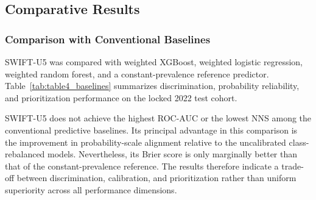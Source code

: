 \documentclass[a4paper,fleqn]{cas-sc}
\begin{document}
\subsection{Comparative Results}
\label{sec:res_comparative}

\subsubsection{Comparison with Conventional Baselines}

SWIFT-U5 was compared with weighted XGBoost, weighted logistic regression, weighted random forest, and a constant-prevalence reference predictor. Table~\ref{tab:table4_baselines} summarizes discrimination, probability reliability, and prioritization performance on the locked 2022 test cohort.

\begin{table}[pos=htbp]
\centering
\caption{Comparison of SWIFT-U5 with conventional predictive baselines on the BDHS 2022 test cohort.}
\label{tab:table4_baselines}
\small
{}
\end{table}

SWIFT-U5 does not achieve the highest ROC-AUC or the lowest NNS among the conventional predictive baselines. Its principal advantage in this comparison is the improvement in probability-scale alignment relative to the uncalibrated class-rebalanced models. Nevertheless, its Brier score is only marginally better than that of the constant-prevalence reference. The results therefore indicate a trade-off between discrimination, calibration, and prioritization rather than uniform superiority across all performance dimensions.
\end{document}
